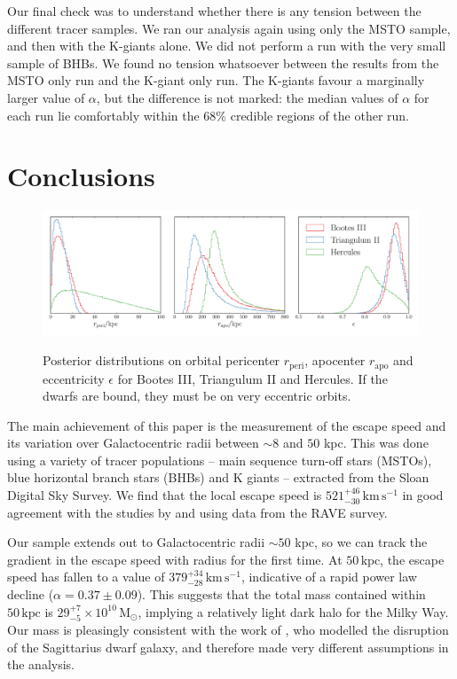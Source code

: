 \documentclass[useAMS,twocolumn,usenatbib]{mn2e}
\def\kpc{{\,\mathrm{kpc}}}
\def\kms{{\,\mathrm{km\,s^{-1}}}}
\def\Msun{{\,\mathrm{M}_\odot}}
\begin{document}
Our final check was to understand whether there is any tension between the different tracer samples. 
We ran our analysis again using only the MSTO sample, and then with the K-giants alone. 
We did not perform a run with the very small sample of BHBs. 
We found no tension whatsoever between the results from the MSTO only run and the K-giant only run. 
The K-giants favour a marginally larger value of $\alpha$, but the difference is not marked: the median values of $\alpha$ for each run lie comfortably within the 68\% credible regions of the other run.

\section{Conclusions}

\begin{figure}
\includegraphics[width=2\columnwidth]{plots/boo_tri_herc}\\
\caption{Posterior distributions on orbital pericenter $r_\mathrm{peri}$, apocenter $r_\mathrm{apo}$ and eccentricity $\epsilon$ for Bootes III, Triangulum II and Hercules. 
If the dwarfs are bound, they must be on very eccentric orbits.}
\label{fig:bootriherc}
\end{figure}

The main achievement of this paper is the measurement of the escape speed and its variation over Galactocentric radii between $\sim 8$ and $50$ kpc.  
This was done using a variety of tracer populations -- main sequence turn-off stars (MSTOs), blue horizontal branch stars (BHBs) and K giants -- extracted from the Sloan Digital Sky Survey. 
We find that the local escape speed is $521^{+46}_{-30}\kms$ in good agreement with the studies by \cite{Sm07} and \cite{Pi14} using data from the RAVE survey.

Our sample extends out to Galactocentric radii $\sim 50$ kpc, so we can track the gradient in the escape speed with radius for the first time. 
At $50\kpc$, the escape speed has fallen to a value of $379^{+34}_{-28}\kms$, indicative of a rapid power law decline ($\alpha = 0.37\pm0.09$).
This suggests that the total mass contained within $50\kpc$ is $29^{+7}_{-5}\times10^{10}\Msun$, implying a relatively light dark halo for the Milky Way. 
Our mass is pleasingly consistent with the work of \citet{Gi14}, who modelled the disruption of the Sagittarius dwarf galaxy, and therefore made very different assumptions in the analysis.
\end{document}
